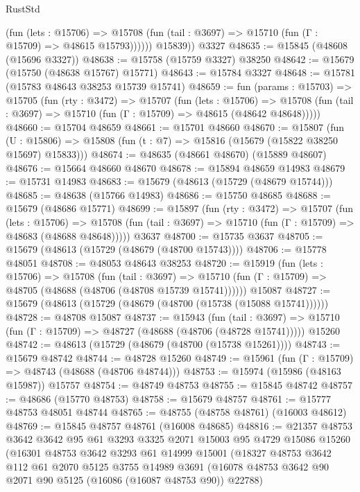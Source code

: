 \begin{lexlean}{RustStd}
\begin{coremodule}
              (fun (lets : @15706) =>
              @15708 (fun (tail : @3697) => @15710 (fun (Γ : @15709) => @48615 @15793))))))
        @15839))
    @3327
@48635 := @15845 (@48608 (@15696 @3327))
@48638 := @15758 (@15759 @3327) @38250
@48642 := @15679 (@15750 (@48638 @15767) @15771)
@48643 := @15784 @3327
@48648 := @15781 (@15783 @48643 @38253 @15739 @15741)
@48659 := fun (params : @15703) =>
  @15705
    (fun (rty : @3472) =>
    @15707
      (fun (lets : @15706) =>
      @15708 (fun (tail : @3697) => @15710 (fun (Γ : @15709) => @48615 (@48642 @48648)))))
@48660 := @15704 @48659
@48661 := @15701 @48660
@48670 := @15807
    (fun (U : @15806) => @15808 (fun (t : @7) => @15816 (@15679 (@15822 @38250 @15697) @15833)))
@48674 := @48635 (@48661 @48670) (@15889 @48607)
@48676 := @15664 @48660 @48670
@48678 := @15894 @48659 @14983
@48679 := @15731 @14983
@48683 := @15679 (@48613 (@15729 (@48679 @15744)))
@48685 := @48638 (@15766 @14983)
@48686 := @15750 @48685
@48688 := @15679 (@48686 @15771)
@48699 := @15897
    (fun (rty : @3472) =>
    @15707
      (fun (lets : @15706) =>
      @15708 (fun (tail : @3697) => @15710 (fun (Γ : @15709) => @48683 (@48688 @48648)))))
    @3637
@48700 := @15735 @3637
@48705 := @15679 (@48613 (@15729 (@48679 (@48700 @15743))))
@48706 := @15778 @48051
@48708 := @48053 @48643 @38253
@48720 := @15919
    (fun (lets : @15706) =>
    @15708
      (fun (tail : @3697) =>
      @15710 (fun (Γ : @15709) => @48705 (@48688 (@48706 (@48708 @15739 @15741))))))
    @15087
@48727 := @15679 (@48613 (@15729 (@48679 (@48700 (@15738 (@15088 @15741))))))
@48728 := @48708 @15087
@48737 := @15943
    (fun (tail : @3697) => @15710 (fun (Γ : @15709) => @48727 (@48688 (@48706 (@48728 @15741)))))
    @15260
@48742 := @48613 (@15729 (@48679 (@48700 (@15738 @15261))))
@48743 := @15679 @48742
@48744 := @48728 @15260
@48749 := @15961 (fun (Γ : @15709) => @48743 (@48688 (@48706 @48744)))
@48753 := @15974 (@15986 (@48163 @15987)) @15757
@48754 := @48749 @48753
@48755 := @15845 @48742
@48757 := @48686 (@15770 @48753)
@48758 := @15679 @48757
@48761 := @15777 @48753 @48051 @48744
@48765 := @48755 (@48758 @48761) (@16003 @48612)
@48769 := @15845 @48757 @48761 (@16008 @48685)
@48816 := @21357
    @48753
    @3642
    @3642
    @95
    @61
    @3293
    @3325
    @2071
    @15003
    @95
    @4729
    @15086
    @15260
    (@16301
      @48753
      @3642
      @3293
      @61
      @14999
      @15001
      (@18327
        @48753
        @3642
        @112
        @61
        @2070
        @5125
        @3755
        @14989
        @3691
        (@16078 @48753 @3642 @90 @2071 @90 @5125 (@16086 (@16087 @48753 @90)) @22788)

\end{coremodule}
\end{lexlean}
